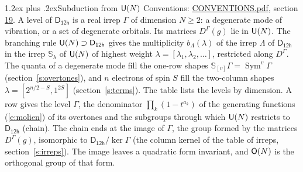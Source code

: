 \documentclass[10pt,a4paper]{article}
\makeatletter
\renewcommand\section{\@startsection{section}{1}{\z@}{-3ex plus -1ex minus -.2ex}%
  {1.2ex plus .2ex}{\normalfont\large\sffamily\bfseries\color{parttitle}}}
\numberwithin{equation}{section}
\newcommand{\grp}[1]{\mathsf{#1}}
\newcommand{\repD}[1]{D^{#1}}
\newcommand{\schur}[1]{\mathbb{S}_{#1}}
\newcommand{\shape}[1]{[#1]}
\makeatother
\begin{document}
\section{Subduction from \texorpdfstring{$\grp{U(\mathnormal{N})}$}{U(N)}}\label{s:unitary}
Conventions: \href{../../CONVENTIONS.pdf}{CONVENTIONS.pdf}, section \href{../../CONVENTIONS.pdf\#conv.19}{19}.
\leavevmode\label{n:local.level.dimension}A level of $\grp{D_{12h}}$ is a real irrep $\Gamma$ of dimension $N \ge 2$: a degenerate mode of vibration, or a set of degenerate orbitals. \label{n:group.unitary}Its matrices $\repD{\Gamma}(g)$ lie in $\grp{U(\mathnormal{N})}$. \label{n:irrep.schur}\label{n:shape.partition}\label{n:local.partition}\label{n:function.multiplicity.unitary}The branching rule $\grp{U(\mathnormal{N})} \supset \grp{D_{12h}}$ gives the multiplicity $b_\Lambda(\lambda)$ of the irrep $\Lambda$ of $\grp{D_{12h}}$ in the irrep $\schur{\lambda}$ of $\grp{U(\mathnormal{N})}$ of highest weight $\lambda = \shape{\lambda_1, \lambda_2, \dots}$, restricted along $\repD{\Gamma}$. \label{n:local.partition.power}\label{n:local.electrons}\label{n:local.spin}The quanta of a degenerate mode fill the one-row shapes $\schur{\shape{v}}\Gamma = \operatorname{Sym}^{v}\Gamma$ (section~\ref{s:overtones}), and $n$ electrons of spin $S$ fill the two-column shapes $\lambda = \shape{2^{n/2-S}, 1^{2S}}$ (section~\ref{s:terms}).
The table lists the levels by dimension. \label{n:head.level}\label{n:head.denominator}\label{n:index.overtone.denominator}\label{n:head.chain}A row gives the level $\Gamma$, the denominator $\prod_k (1 - t^{a_k})$ of the generating functions (\ref{e:molien}) of its overtones and the subgroups through which $\grp{U(\mathnormal{N})}$ restricts to $\grp{D_{12h}}$ (chain). The chain ends at the image of $\Gamma$, the group formed by the matrices $\repD{\Gamma}(g)$, isomorphic to $\grp{D_{12h}}/\ker\Gamma$ (the column kernel of the table of irreps, section~\ref{s:irreps}). The image leaves a quadratic form invariant, and $\grp{O(\mathnormal{N})}$ is the orthogonal group of that form.
\end{document}
